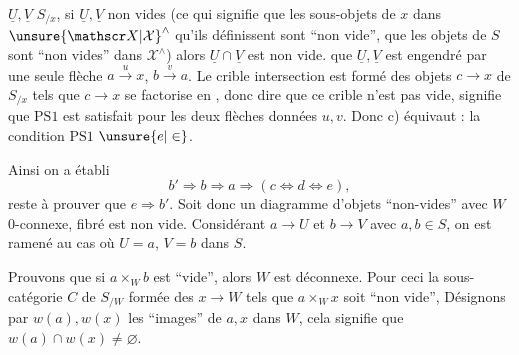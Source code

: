 $\underline U,\underline V$  $S_{/x}$, si $\underline U,\underline V$ non vides (ce qui signifie que les sous-objets de $x$ dans $\unsure{\mathscr X|\mathcal X}^{\wedge}$ qu'ils définissent sont ``non vide'',  que les objets de $S$ sont ``non vides''  dans $\mathscr X^{\wedge}$) alors $\underline U\cap\underline V$ est non vide.  que $\underline U,\underline V$ est engendré  par une seule flèche $a\overset u\longrightarrow x$, $b\overset v\longrightarrow a$. Le  crible intersection est formé des objets $c\longrightarrow x$ de $S_{/x}$ tels que $c\longrightarrow x$ se factorise  en
, donc  dire que ce crible n'est pas vide, signifie  que $\mathrm{PS}1$ est satisfait pour les deux flèches données $u,v$. Donc c) équivaut : la condition $\mathrm{PS}1$ $\unsure{e|\in}$.

Ainsi on a établi
\[
b'\Longrightarrow b\Longrightarrow a\Longrightarrow(c\Longleftrightarrow d\Longleftrightarrow e),
\]
reste à prouver que $e\Longrightarrow b'$. Soit donc
un diagramme d'objets ``non-vides''  avec $W$ $0$-connexe,    fibré est non vide.  Considérant $a\longrightarrow U$ et $b\longrightarrow V$ avec $a,b\in S$, on est ramené au cas où $U=a$, $V=b$  dans $S$.

Prouvons que si $a\times_W b$ est ``vide'', alors $W$ est déconnexe. Pour ceci   la sous-catégorie $C$ de $S_{/W}$ formée des $x\longrightarrow W$ tels que $a\times_W x$ soit ``non vide'',  Désignons par $w(a),w(x)$ les ``images'' de $a,x$ dans $W$, cela signifie que $w(a)\cap w(x)\ne\varnothing$.

